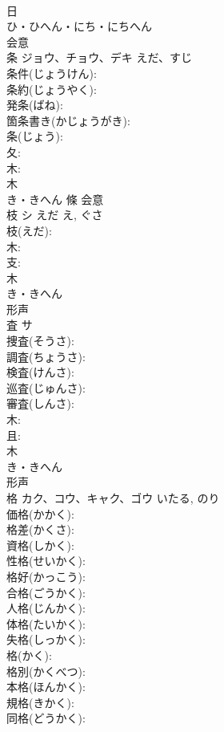 \documentclass[8pt]{extreport}
\begin{document}
\begin{CJK}{UTF8}{min}
\\	日	
\\	ひ・ひへん・にち・にちへん	
\\	会意 
\\	条	ジョウ、チョウ、デキ	えだ、すじ		
\\	条件(じょうけん): 
\\	条約(じょうやく): 
\\	発条(ばね): 
\\	箇条書き(かじょうがき): 
\\	条(じょう): 
\\	夂: 
\\	木: 
\\	木	
\\	き・きへん	條	会意 
\\	枝	シ	えだ	え, ぐさ	
\\	枝(えだ): 
\\	木: 
\\	支: 
\\	木	
\\	き・きへん	
\\	形声 
\\	査	サ			
\\	捜査(そうさ): 
\\	調査(ちょうさ): 
\\	検査(けんさ): 
\\	巡査(じゅんさ): 
\\	審査(しんさ): 
\\	木: 
\\	且: 
\\	木	
\\	き・きへん	
\\	形声 
\\	格	カク、コウ、キャク、ゴウ		いたる, のり	
\\	価格(かかく): 
\\	格差(かくさ): 
\\	資格(しかく): 
\\	性格(せいかく): 
\\	格好(かっこう): 
\\	合格(ごうかく): 
\\	人格(じんかく): 
\\	体格(たいかく): 
\\	失格(しっかく): 
\\	格(かく): 
\\	格別(かくべつ): 
\\	本格(ほんかく): 
\\	規格(きかく): 
\\	同格(どうかく): 

\end{CJK}
\end{document}

